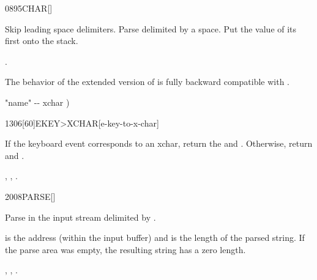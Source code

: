 \vspace*{-2ex}
\begin{worddef}{0895}{CHAR}[]%
\item {}

	Skip leading space delimiters.  Parse  delimited by a space.
	Put the value of its first  onto the stack.

\see {}.

	\begin{rationale} %
		The behavior of the extended version of  is fully backward
		compatible with .
	\end{rationale}

	\begin{implement} %
	\word{:}   "name" -{}- xchar )
		      \word{;}
	\end{implement}
\end{worddef}


\vspace*{-2ex}
\begin{worddef}[EKEYtoXCHAR]{1306}[60]{EKEY>XCHAR}[e-key-to-x-char]%
\item {}

	If the keyboard event  corresponds to an xchar, return the
	 and .  Otherwise, return  and
	.

\see {},
	,
	.
\end{worddef}


\vspace*{-2ex}
\enlargethispage{6ex}
\begin{worddef}{2008}{PARSE}[]%
\item {}

  Parse  in the input stream delimited by .

	 is the address (within the input buffer) and 
	is the length of the parsed string. If the parse area was empty, the
	resulting string has a zero length.

\see {},
	,
	.
\end{worddef}

